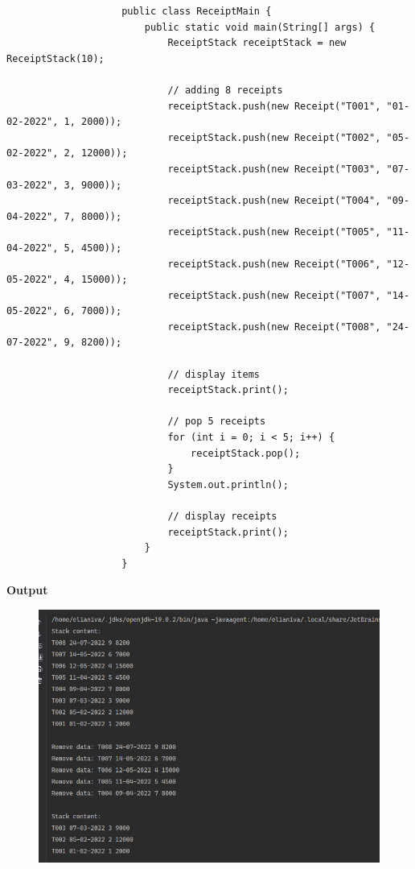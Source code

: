 \documentclass[12pt,titlepage]{article}
\begin{document}
\begin{enumerate}
{\begin{itemize}
{                \begin{verbatim}
                    public class ReceiptMain {
                        public static void main(String[] args) {
                            ReceiptStack receiptStack = new ReceiptStack(10);

                            // adding 8 receipts
                            receiptStack.push(new Receipt("T001", "01-02-2022", 1, 2000));
                            receiptStack.push(new Receipt("T002", "05-02-2022", 2, 12000));
                            receiptStack.push(new Receipt("T003", "07-03-2022", 3, 9000));
                            receiptStack.push(new Receipt("T004", "09-04-2022", 7, 8000));
                            receiptStack.push(new Receipt("T005", "11-04-2022", 5, 4500));
                            receiptStack.push(new Receipt("T006", "12-05-2022", 4, 15000));
                            receiptStack.push(new Receipt("T007", "14-05-2022", 6, 7000));
                            receiptStack.push(new Receipt("T008", "24-07-2022", 9, 8200));

                            // display items
                            receiptStack.print();

                            // pop 5 receipts
                            for (int i = 0; i < 5; i++) {
                                receiptStack.pop();
                            }
                            System.out.println();

                            // display receipts
                            receiptStack.print();
                        }
                    }
                \end{verbatim}
            }
        \end{itemize}
        \pagebreak
        \textbf{Output}
        \begin{figure}[h]
            \centering
            \includegraphics[width=.6\textwidth]{./images/assignment-output.png}
        \end{figure}
    }
\end{enumerate}
\end{document}

